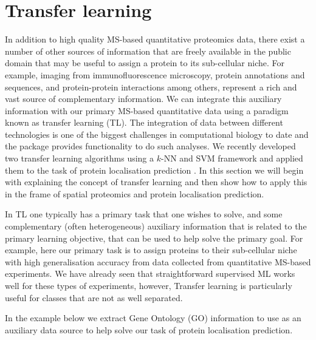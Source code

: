 \clearpage

\section*{Transfer learning}

In addition to high quality MS-based quantitative proteomics data,
there exist a number of other sources of information that are freely
available in the public domain that may be useful to assign a protein
to its sub-cellular niche. For example, imaging from
immunofluorescence microscopy, protein annotations and sequences, and
protein-protein interactions among others, represent a rich and vast
source of complementary information. We can integrate this auxiliary
information with our primary MS-based quantitative data using a
paradigm known as transfer learning (TL). The integration of data
between different technologies is one of the biggest challenges in
computational biology to date and the  package
provides functionality to do such analyses. We recently developed two
transfer learning algorithms using a $k$-NN and SVM framework and
applied them to the task of protein localisation prediction
\cite{Breckels:2016}. In this section we will begin with explaining
the concept of transfer learning and then show how to apply this in
the frame of spatial proteomics and protein localisation prediction.

In TL one typically has a primary task that one wishes to solve, and
some complementary (often heterogeneous) auxiliary information that is
related to the primary learning objective, that can be used to help
solve the primary goal. For example, here our primary task is to
assign proteins to their sub-cellular niche with high generalisation
accuracy from data collected from quantitative MS-based experiments.
We have already seen that straightforward supervised ML works well for
these types of experiments, however, Transfer learning is particularly
useful for classes that are not as well separated.

In the example below we extract Gene Ontology (GO) information to use
as an auxiliary data source to help solve our task of protein
localisation prediction.

